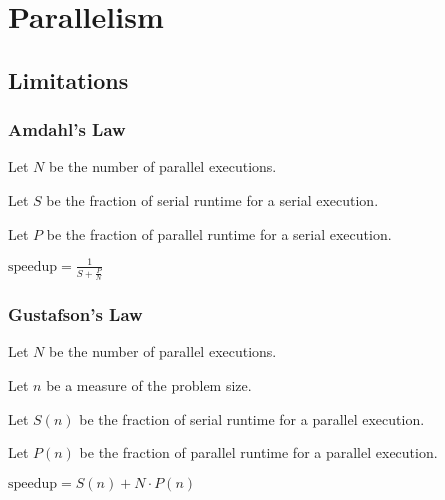 \chapter{Parallelism}

\section{Limitations}

\subsection{Amdahl's Law}

Let $N$ be the number of parallel executions.

\noindent Let $S$ be the fraction of serial runtime for a serial execution.

\noindent Let $P$ be the fraction of parallel runtime for a serial execution.

\vspace{1em}

$\text{speedup} = \frac{1}{S + \frac{P}{N}}$

\subsection{Gustafson's Law}

Let $N$ be the number of parallel executions.

\noindent Let $n$ be a measure of the problem size.

\noindent Let $S(n)$ be the fraction of serial runtime for a parallel
execution.

\noindent Let $P(n)$ be the fraction of parallel runtime for a parallel
execution.

\vspace{1em}

$\text{speedup} = S(n) + N \cdot P(n)$
